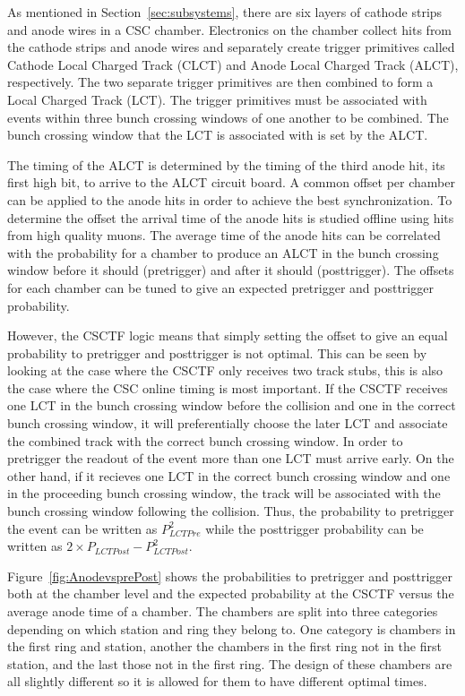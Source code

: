 As mentioned in Section~\ref{sec:subsystems}, there are six layers of cathode strips and anode wires in a CSC chamber.
Electronics on the chamber collect hits from the cathode strips and anode wires and separately create trigger primitives called Cathode Local Charged Track (CLCT)
and Anode Local Charged Track (ALCT), respectively. The two separate trigger primitives are then combined to form a Local Charged Track (LCT). The trigger primitives
must be associated with events within three bunch crossing windows of one another to be combined.
The bunch crossing window that the LCT is associated with is set by the ALCT.

The timing of the ALCT is determined by the timing of the third anode hit, its first high bit, 
to arrive to the ALCT circuit board. A common offset per chamber can be applied to the
anode hits in order to achieve the best synchronization. To determine the offset the arrival time of the anode hits is studied offline using hits from
high quality muons. The average time of the anode
hits can be correlated with the probability for a chamber to produce an ALCT in the bunch crossing window before it should (pretrigger) and after it should (posttrigger).
The offsets for each chamber can be tuned to give an expected pretrigger and posttrigger probability.

However, the CSCTF logic means that simply setting the offset to give an equal probability to pretrigger and posttrigger is not optimal. This can be seen by looking at
the case where the CSCTF only receives two track stubs, this is also the case where the CSC online timing is most important. If the CSCTF receives one LCT in the bunch
crossing window before the collision and one in the correct bunch crossing window, it will preferentially choose the later LCT and associate the combined track with the correct
bunch crossing window.  In order to pretrigger the readout of the event more than one LCT must arrive early.
On the other hand, if it recieves one LCT in the correct bunch crossing window and one in the proceeding bunch crossing window, the track will be associated with the
bunch crossing window following the collision. Thus, the probability to pretrigger the event can be written as $P_{LCTPre}^2$ while the posttrigger probability can be written as
$2 \times P_{LCTPost} - P_{LCTPost}^2$. 

Figure~\ref{fig:AnodevsprePost} shows the probabilities to pretrigger and posttrigger both at the chamber level and the expected probability at the CSCTF versus
the average anode time of a chamber. The chambers are split into three categories depending on which station and ring they belong to. One category is chambers in the
first ring and station, another the chambers in the first ring not in the first station, and the last those not in the first ring. The design of these chambers are all
slightly different so it is allowed for them to have different optimal times.

